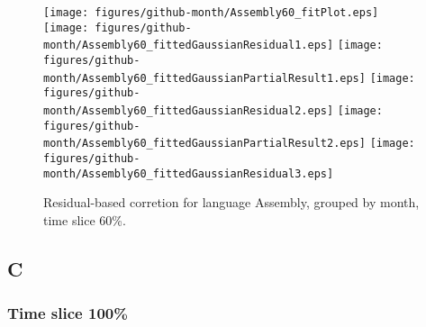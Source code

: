 \begin{figure}[hb]
\centering
{}
{\texttt{[image: figures/github-month/Assembly60\_fitPlot.eps]}}
{\texttt{[image: figures/github-month/Assembly60\_fittedGaussianResidual1.eps]}}
{\texttt{[image: figures/github-month/Assembly60\_fittedGaussianPartialResult1.eps]}}
{\texttt{[image: figures/github-month/Assembly60\_fittedGaussianResidual2.eps]}}
{\texttt{[image: figures/github-month/Assembly60\_fittedGaussianPartialResult2.eps]}}
{\texttt{[image: figures/github-month/Assembly60\_fittedGaussianResidual3.eps]}}
\caption{Residual-based corretion for language Assembly, grouped by month, time slice 60\%.}
\end{figure}


\clearpage 
\newpage 


\subsection{C}

\FloatBarrier

\subsubsection{Time slice 100\%}

